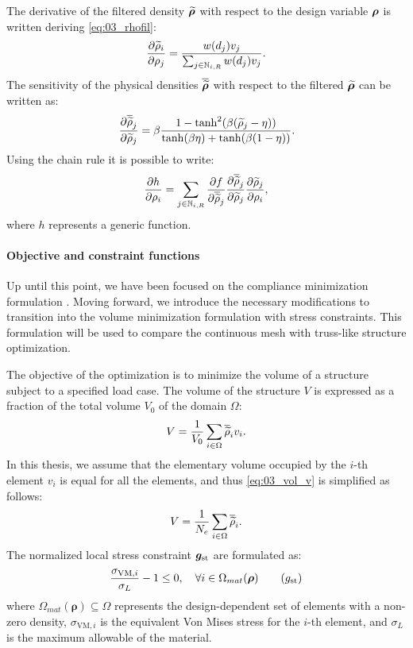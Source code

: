 The derivative of the filtered density $\bm{\widetilde{\rho}}$ with respect to the design variable $\bm{\rho}$ is written deriving \eqref{eq:03_rhofil}:
\begin{equation}
    \frac{\partial\widetilde{\rho}_i}{\partial\rho_j} = \frac{w(d_j)v_j}{\sum_{j \in \mathbb{N}_{i,R}} w(d_j)v_j}.
    \label{eq:03_sens_filt}
\end{equation}
The sensitivity of the physical densities $\bm{\overline{\widetilde{\rho}}}$ with respect to the filtered $\bm{\widetilde{\rho}}$ can be written as:
\begin{equation}
    \frac{\partial\overline{\widetilde{\rho}}_j}{\partial\widetilde{\rho}_j} = \beta \frac{1-\tanh^2(\beta(\widetilde{\rho}_j-\eta))}{\tanh(\beta\eta)+\tanh(\beta(1 - \eta))}.
    \label{eq:03_sens_proj}
\end{equation}
Using the chain rule it is possible to write:
\begin{equation}
    \label{eq:03_chain}
    \frac{\partial h}{\partial\rho_i} = \sum_{j \in \mathbb{N}_{i,R}} \frac{\partial f}{\partial\overline{\widetilde{\rho}}_j} \frac{\partial\overline{\widetilde{\rho}}_j}{\partial\widetilde{\rho}_j} \frac{\partial\widetilde{\rho}_j}{\partial\rho_i},
\end{equation}
where $h$ represents a generic function.
\paragraph{Objective and constraint functions}
Up until this point, we have been focused on the compliance minimization formulation . Moving forward, we introduce the necessary modifications to transition into the volume minimization formulation with stress constraints. This formulation will be used to compare the continuous mesh with truss-like structure optimization.

The objective of the optimization is to minimize the volume of a structure subject to a specified load case. The volume of the structure $V$ is expressed as a fraction of the total volume $V_0$ of the domain $\Omega$:
\begin{equation}
    V = \frac{1}{V_0}\sum_{i \in \Omega} \overline{\widetilde{\rho}}_i v_i.
    \label{eq:03_vol_v}
\end{equation}
In this thesis, we assume that the elementary volume occupied by the $i$-th element $v_i$ is equal for all the elements, and thus \eqref{eq:03_vol_v} is simplified as follows:
\begin{equation}
    V = \frac{1}{N_{e}} \sum_{i \in \Omega} \overline{\widetilde{\rho}}_i. 
    \label{eq:03_obj_vol}  
\end{equation}
The normalized local stress constraint $\bm{g}_{\text{st}}$ are formulated as:
\begin{equation}
    \frac{\sigma_{\text{VM},i}}{\sigma_L}-1 \leq 0, \quad \forall i \in \Omega_{mat}(\bm{\rho})
    \tag{$g_{\text{st}}$}
\end{equation}
where $\Omega_{mat}(\bm{\rho}) \subseteq \Omega$ represents the design-dependent set of elements with a non-zero density, $\sigma_{\text{VM},i}$ is the equivalent Von Mises stress for the $i$-th element, and $\sigma_L$ is the maximum allowable of the material.

